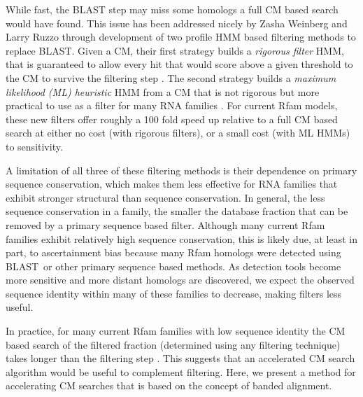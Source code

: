 \documentclass[11pt]{article}
\def\blast{\textsc{BLAST}~}
\begin{document}
While fast, the \textsc{BLAST} step may miss some homologs a full CM
based search would have found. This issue has been addressed nicely
by Zasha Weinberg and Larry Ruzzo through development of two profile HMM
based filtering methods to replace \textsc{BLAST}. Given a CM, their
first strategy builds a \emph{rigorous filter} HMM, that is guaranteed
to allow every hit that would score above a given threshold to the CM
to survive the filtering step \cite{Weinberg04, Weinberg04b}. The second
strategy builds a \emph{maximum likelihood (ML) heuristic} HMM from a
CM that is not rigorous but more practical to use as a filter for many
RNA families \cite{Weinberg05}. For current Rfam models, these new
filters offer roughly a 100 fold speed up relative to a full CM based search 
at either no cost (with rigorous filters), or a small cost (with ML HMMs) to
sensitivity.

A limitation of all three of these filtering methods is their
dependence on primary sequence conservation, which makes them less
effective for RNA families that exhibit stronger structural than
sequence conservation. In general, the less sequence
conservation in a family, the smaller the database fraction that can
be removed by a primary sequence based filter. 
Although many current Rfam families exhibit relatively high sequence
conservation, this is likely due, at least in part, to ascertainment
bias because many Rfam homologs were detected using \blast or other primary
sequence based methods. 
As detection tools become more sensitive and more distant homologs
are discovered,
we expect the observed
sequence identity within many of these families to decrease, making
filters less useful.

In practice, for many current Rfam families with low sequence identity
the CM based search of the filtered fraction (determined using any
filtering technique) takes longer than the filtering step
\cite{Weinberg05}. This suggests that an accelerated CM search
algorithm would be useful to complement filtering. Here, we present a
method for accelerating CM searches that is based on the concept of
banded alignment. 
\end{document}
